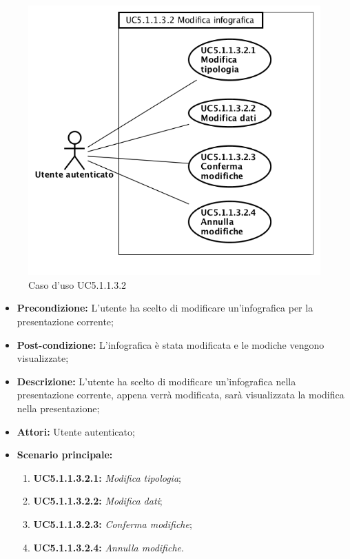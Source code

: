\begin{figure}[h]
	\begin{center}
	\includegraphics[scale=0.4]{diagram/UC5-1-1-3-2.png}
	\caption{Caso d'uso UC5.1.1.3.2}
	\end{center}
\end{figure}
\begin{itemize}
	\item \textbf{Precondizione:} L'utente ha scelto di modificare un'infografica per la presentazione corrente;
	\item \textbf{Post-condizione:} L'infografica è stata modificata e le modiche vengono visualizzate;
	\item \textbf{Descrizione:} L'utente ha scelto di modificare un'infografica nella presentazione corrente, appena verrà modificata, sarà visualizzata la modifica nella presentazione;
	\item \textbf{Attori:} Utente autenticato;
	\item \textbf{Scenario principale:}
	\begin{enumerate}
		\item \textbf{ UC5.1.1.3.2.1:} \textit{ Modifica tipologia};
		\item \textbf{ UC5.1.1.3.2.2:} \textit{ Modifica dati};
		\item \textbf{ UC5.1.1.3.2.3:} \textit{ Conferma modifiche};
		\item \textbf{ UC5.1.1.3.2.4:} \textit{ Annulla modifiche}.
	\end{enumerate}
\end{itemize}
